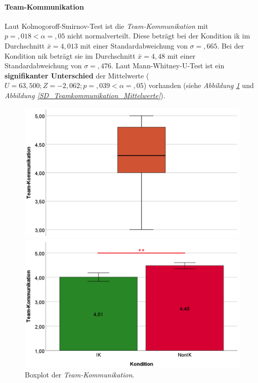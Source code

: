 \documentclass[a4paper,11pt]{article}%
\renewcommand{\\}{\vspace*{0.5\baselineskip} \newline}
\begin{document}
{\paragraph{Team-Kommunikation} 
Laut Kolmogoroff-Smirnov-Test ist die \textit{Team-Kommunikation} mit $p =,018 < \alpha = ,05$ nicht normalverteilt. 
Diese beträgt bei der Kondition \ac{ik} im Durchschnitt $\bar{x} = 4,013$ mit einer Standardabweichung von $\sigma =,665$.
Bei der Kondition \ac{nik} beträgt sie im Durchschnitt $\bar{x} = 4,48$ mit einer Standardabweichung von $\sigma =,476$. 
Laut Mann-Whitney-U-Test ist ein \textbf{signifikanter Unterschied} der Mittelwerte ($U = 63,500; Z = -2,062; p =,039 < \alpha = ,05$) vorhanden (siehe \textit{Abbildung \ref{SD_TeamkommunikationBP}} und \textit{Abbildung \ref{SD_Teamkommunikation_Mittelwerte}}).

	\begin{figure}[H]
   \begin{minipage}[t]{.5\linewidth} %
      \includegraphics[width=\linewidth]{Abbildungen/AuswertungDiagramme/Final/BP_Teamkommunikation.png}
      \caption[Boxplot der Team-Kommunikation]{Boxplot der \textit{Team-Kommunikation}.}
            \label{SD_TeamkommunikationBP}
   \end{minipage}
   \hspace{.02\linewidth}%
   \begin{minipage}[t]{.5\linewidth} %
     \includegraphics[width=\linewidth]{Abbildungen/AuswertungDiagramme/Final/SD_Teamkommunikation_Mittelwerte.png}

\end{minipage}
\end{figure}}
\end{document}
